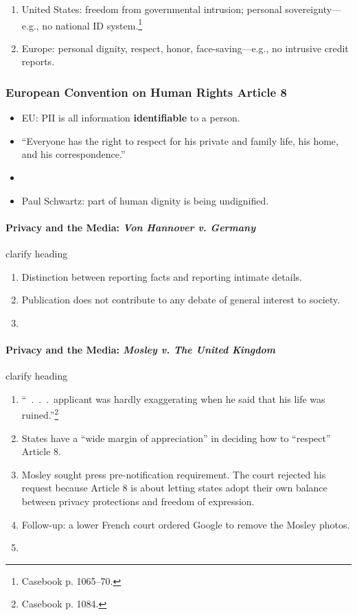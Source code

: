 \begin{enumerate}
    \item United States: freedom from governmental intrusion; personal 
    sovereignty---e.g., no national ID system.\footnote{Casebook p. 1065--70.}
    \item Europe: personal dignity, respect, honor, face-saving---e.g., no 
    intrusive credit reports.
\end{enumerate}

\subsubsection{European Convention on Human Rights Article 8}

\begin{itemize}
    \item EU: PII is all information \textbf{identifiable} to a person.
    \item ``Everyone has the right to respect for his private and family life, 
    his home, and his correspondence.''
    \item %
    \item Paul Schwartz: part of human dignity is being undignified.
\end{itemize}

\paragraph{Privacy and the Media: \emph{Von Hannover v. Germany}} %
clarify heading

\begin{enumerate}
    \item Distinction between reporting facts and reporting intimate details.
    \item Publication does not contribute to any debate of general interest to 
    society.
    \item %
\end{enumerate}

\paragraph{Privacy and the Media: \emph{Mosley v. The United Kingdom}} %
clarify heading

\begin{enumerate}
    \item ``~.~.~.~applicant was hardly exaggerating when he said that his life 
    was ruined.''\footnote{Casebook p. 1084.}
    \item States have a ``wide margin of appreciation'' in deciding how to 
    ``respect'' Article 8.
    \item Mosley sought press pre-notification requirement. The court rejected 
    his request because Article 8 is about letting states adopt their own 
    balance between privacy protections and freedom of expression.
    \item Follow-up: a lower French court ordered Google to remove the Mosley 
    photos.
    \item %
\end{enumerate}

